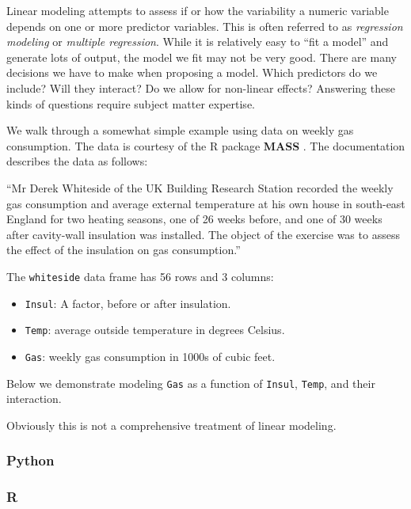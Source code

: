 \documentclass[
]{book}
\providecommand{\tightlist}{%
  \setlength{\itemsep}{0pt}\setlength{\parskip}{0pt}}
\begin{document}
Linear modeling attempts to assess if or how the variability a numeric variable depends on one or more predictor variables. This is often referred to as \emph{regression modeling} or \emph{multiple regression}. While it is relatively easy to ``fit a model'' and generate lots of output, the model we fit may not be very good. There are many decisions we have to make when proposing a model. Which predictors do we include? Will they interact? Do we allow for non-linear effects? Answering these kinds of questions require subject matter expertise.

We walk through a somewhat simple example using data on weekly gas consumption. The data is courtesy of the R package \textbf{MASS} \citep{MASS}. The documentation describes the data as follows:

``Mr Derek Whiteside of the UK Building Research Station recorded the weekly gas consumption and average external temperature at his own house in south-east England for two heating seasons, one of 26 weeks before, and one of 30 weeks after cavity-wall insulation was installed. The object of the exercise was to assess the effect of the insulation on gas consumption.''

The \texttt{whiteside} data frame has 56 rows and 3 columns:

\begin{itemize}
\tightlist
\item
  \texttt{Insul}: A factor, before or after insulation.
\item
  \texttt{Temp}: average outside temperature in degrees Celsius.
\item
  \texttt{Gas}: weekly gas consumption in 1000s of cubic feet.
\end{itemize}

Below we demonstrate modeling \texttt{Gas} as a function of \texttt{Insul}, \texttt{Temp}, and their interaction.

Obviously this is not a comprehensive treatment of linear modeling.

\hypertarget{python-49}{%
\subsubsection*{Python}\label{python-49}}

\hypertarget{r-49}{%
\subsubsection*{R}\label{r-49}}
\end{document}
